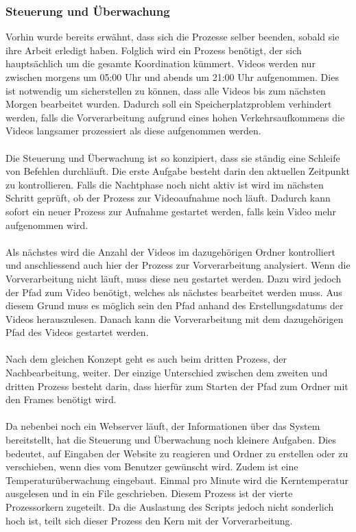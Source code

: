 \subsubsection{Steuerung und Überwachung}
Vorhin wurde bereits erwähnt, dass sich die Prozesse selber beenden, sobald sie ihre Arbeit erledigt haben. Folglich wird ein Prozess benötigt, der sich hauptsächlich um die gesamte Koordination kümmert. Videos werden nur zwischen morgens um 05:00 Uhr und abends um 21:00 Uhr aufgenommen. Dies ist notwendig um sicherstellen zu können, dass alle Videos bis zum nächsten Morgen bearbeitet wurden. Dadurch soll ein Speicherplatzproblem verhindert werden, falls die Vorverarbeitung aufgrund eines hohen Verkehrsaufkommens die Videos langsamer prozessiert als diese aufgenommen werden.\\\\
Die Steuerung und Überwachung ist so konzipiert, dass sie ständig eine Schleife von Befehlen durchläuft. Die erste Aufgabe besteht darin den aktuellen Zeitpunkt zu kontrollieren. Falls die Nachtphase noch nicht aktiv ist wird im nächsten Schritt geprüft, ob der Prozess zur Videoaufnahme noch läuft. Dadurch kann sofort ein neuer Prozess zur Aufnahme gestartet werden, falls kein Video mehr aufgenommen wird.\\\\
Als nächstes wird die Anzahl der Videos im dazugehörigen Ordner kontrolliert und anschliessend auch hier der Prozess zur Vorverarbeitung analysiert. Wenn die Vorverarbeitung nicht läuft, muss diese neu gestartet werden. Dazu wird jedoch der Pfad zum Video benötigt, welches als nächstes bearbeitet werden muss. Aus diesem Grund muss es möglich sein den Pfad anhand des Erstellungsdatums der Videos herauszulesen. Danach kann die Vorverarbeitung mit dem dazugehörigen Pfad des Videos gestartet werden.\\\\
Nach dem gleichen Konzept geht es auch beim dritten Prozess, der Nachbearbeitung, weiter. Der einzige Unterschied zwischen dem zweiten und dritten Prozess besteht darin, dass hierfür zum Starten der Pfad zum Ordner mit den Frames benötigt wird.\\\\
Da nebenbei noch ein Webserver läuft, der Informationen über das System bereitstellt, hat die Steuerung und Überwachung noch kleinere Aufgaben. Dies bedeutet, auf Eingaben der Website zu reagieren und Ordner zu erstellen oder zu verschieben, wenn dies vom Benutzer gewünscht wird. Zudem ist eine Temperaturüberwachung eingebaut. Einmal pro Minute wird die Kerntemperatur ausgelesen und in ein File geschrieben. Diesem Prozess ist der vierte Prozessorkern zugeteilt. Da die Auslastung des Scripts jedoch nicht sonderlich hoch ist, teilt sich dieser Prozess den Kern mit der Vorverarbeitung. \cite{Bash}
